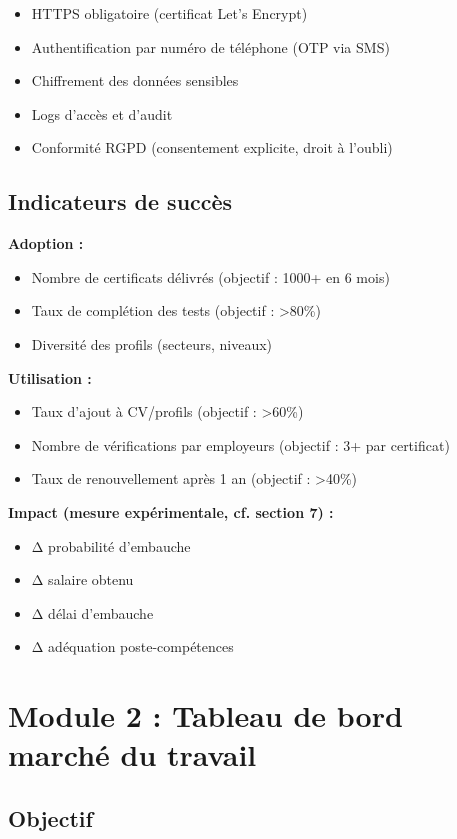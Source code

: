 \documentclass[12pt]{article}
\begin{document}
\begin{itemize}
    \item HTTPS obligatoire (certificat Let's Encrypt)
    \item Authentification par numéro de téléphone (OTP via SMS)
    \item Chiffrement des données sensibles
    \item Logs d'accès et d'audit
    \item Conformité RGPD (consentement explicite, droit à l'oubli)
\end{itemize}

\subsection{Indicateurs de succès}

\textbf{Adoption :}
\begin{itemize}
    \item Nombre de certificats délivrés (objectif : 1000+ en 6 mois)
    \item Taux de complétion des tests (objectif : >80\%)
    \item Diversité des profils (secteurs, niveaux)
\end{itemize}

\textbf{Utilisation :}
\begin{itemize}
    \item Taux d'ajout à CV/profils (objectif : >60\%)
    \item Nombre de vérifications par employeurs (objectif : 3+ par certificat)
    \item Taux de renouvellement après 1 an (objectif : >40\%)
\end{itemize}

\textbf{Impact (mesure expérimentale, cf. section 7) :}
\begin{itemize}
    \item Δ probabilité d'embauche
    \item Δ salaire obtenu
    \item Δ délai d'embauche
    \item Δ adéquation poste-compétences
\end{itemize}

\section{Module 2 : Tableau de bord marché du travail}

\subsection{Objectif}
\end{document}
